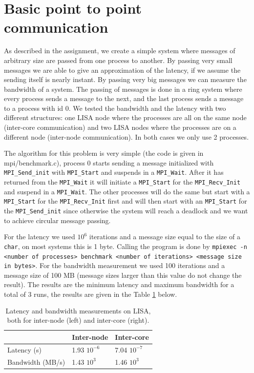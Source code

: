 \documentclass[11pt,a4paper,onecolumn]{article}
\begin{document}
\section{Basic point to point communication}
As described in the assignment, we create a simple system where messages of arbitrary size are passed from one process to another. By passing very small messages we are able to give an approximation of the latency, if we assume the sending itself is nearly instant. By passing very big messages we can measure the bandwidth of a system. The passing of messages is done in a ring system where every process sends a message to the next, and the last process sends a message to a process with id 0. We tested the bandwidth and the latency with two different structures: one LISA node where the processes are all on the same node (inter-core communication) and two LISA nodes where the processes are on a different node (inter-node communication). In both cases we only use 2 processes.

The algorithm for this problem is very simple (the code is given in mpi/benchmark.c), process 0 starts sending a message initialized with \texttt{MPI\_Send\_init} with \texttt{MPI\_Start} and suspends in a \texttt{MPI\_Wait}. After it has returned from the \texttt{MPI\_Wait} it will initiate a \texttt{MPI\_Start} for the \texttt{MPI\_Recv\_Init} and suspend in a \texttt{MPI\_Wait}. The other processes will do the same but start with a \texttt{MPI\_Start} for the \texttt{MPI\_Recv\_Init} first and will then start with an \texttt{MPI\_Start} for the \texttt{MPI\_Send\_init} since otherwise the system will reach a deadlock and we want to achieve circular message passing.  

For the latency we used $10^6$ iterations and a message size equal to the size of a \texttt{char}, on most systems this is 1 byte. Calling the program is done by \texttt{mpiexec -n <number of processes> benchmark <number of iterations> <message size in bytes>}. For the bandwidth measurement we used 100 iterations and a message size of 100 MB (message sizes larger than this value do not change the result). The results are the minimum latency and maximum bandwidth for a total of 3 runs, the results are given in the Table \ref{tab:point} below.

\begin{table}[H]
  \centering
  \begin{tabular}{l | l | l }
    & Inter-node & Inter-core \\
    \hline
    Latency (s) & 1.93 $10^{-6}$ & 7.04 $10^{-7}$\\
    Bandwidth (MB/s) & 1.43 $10^3$ & 1.46 $10^3$\\
  \end{tabular}
  \caption{Latency and bandwidth measurements on LISA, both for inter-node (left) and inter-core (right).}
  \label{tab:point}
\end{table}
\end{document}
